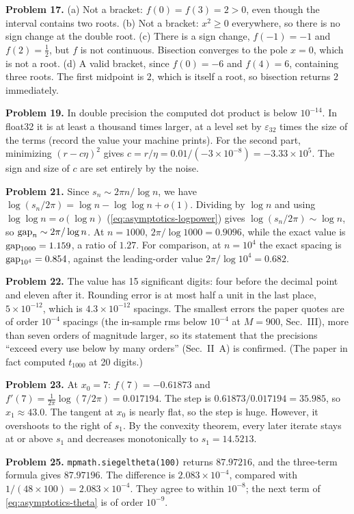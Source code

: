 \textbf{Problem 17.} (a) Not a bracket: $f(0)=f(3)=2>0$, even though the interval contains two roots. (b) Not a bracket: $x^2\ge0$ everywhere, so there is no sign change at the double root. (c) There is a sign change, $f(-1)=-1$ and $f(2)=\tfrac12$, but $f$ is not continuous. Bisection converges to the pole $x=0$, which is not a root. (d) A valid bracket, since $f(0)=-6$ and $f(4)=6$, containing three roots. The first midpoint is $2$, which is itself a root, so bisection returns $2$ immediately.

\textbf{Problem 19.} In double precision the computed dot product is below $10^{-14}$. In float32 it is at least a thousand times larger, at a level set by $\varepsilon_{32}$ times the size of the terms (record the value your machine prints). For the second part, minimizing $(r-c\eta)^2$ gives $c=r/\eta=0.01/(-3\times10^{-8})=-3.33\times10^{5}$. The sign and size of $c$ are set entirely by the noise.

\textbf{Problem 21.} Since $s_n\sim2\pi n/\log n$, we have $\log(s_n/2\pi)=\log n-\log\log n+o(1)$. Dividing by $\log n$ and using $\log\log n=o(\log n)$ (\cref{eq:asymptotics-logpower}) gives $\log(s_n/2\pi)\sim\log n$, so $\mathrm{gap}_n\sim2\pi/\log n$. At $n=1000$, $2\pi/\log1000=0.9096$, while the exact value is $\mathrm{gap}_{1000}=1.159$, a ratio of $1.27$. For comparison, at $n=10^4$ the exact spacing is $\mathrm{gap}_{10^4}=0.854$, against the leading-order value $2\pi/\log10^4=0.682$.

\textbf{Problem 22.} The value has 15 significant digits: four before the decimal point and eleven after it. Rounding error is at most half a unit in the last place, $5\times10^{-12}$, which is $4.3\times10^{-12}$ spacings. The smallest errors the paper quotes are of order $10^{-4}$ spacings (the in-sample rms below $10^{-4}$ at $M=900$, Sec.~III), more than seven orders of magnitude larger, so its statement that the precisions ``exceed every use below by many orders'' (Sec.~II~A) is confirmed. (The paper in fact computed $t_{1000}$ at 20 digits.)

\textbf{Problem 23.} At $x_0=7$: $f(7)=-0.61873$ and $f'(7)=\frac1{2\pi}\log(7/2\pi)=0.017194$. The step is $0.61873/0.017194=35.985$, so $x_1\approx43.0$. The tangent at $x_0$ is nearly flat, so the step is huge. However, it overshoots to the right of $s_1$. By the convexity theorem, every later iterate stays at or above $s_1$ and decreases monotonically to $s_1=14.5213$.

\textbf{Problem 25.} \texttt{mpmath.siegeltheta(100)} returns $87.97216$, and the three-term formula gives $87.97196$. The difference is $2.083\times10^{-4}$, compared with $1/(48\times100)=2.083\times10^{-4}$. They agree to within $10^{-8}$; the next term of \cref{eq:asymptotics-theta} is of order $10^{-9}$.

